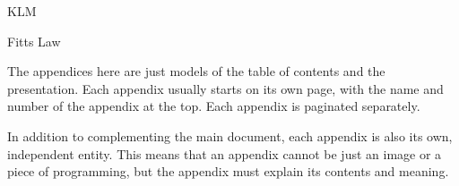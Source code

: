 \documentclass[english]{tktltiki}
\begin{document}
KLM

Fitts Law




\nocite{*}



\lastpage

\appendices

\pagestyle{empty}


The appendices here are just models of the table of contents and the presentation. Each appendix 
usually starts on its own page, with the name and number of the appendix at the top. Each appendix is paginated separately.

In addition to complementing the main document, each appendix is also its own, independent entity. 
This means that an appendix cannot be just an image or a piece of programming, but the appendix must explain its contents and meaning.
\end{document}
